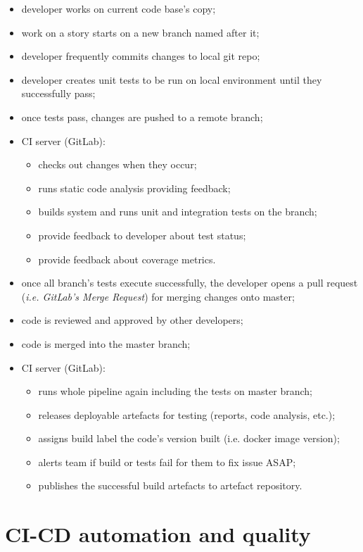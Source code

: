 \documentclass[a4paper,
	       keeplastbox,   %
	       References
	       ]{jacow}
\begin{document}
\begin{itemize}
	\setlength\itemsep{0.1em}
    \item developer works on current code base's copy;
	\item work on a story starts on a new branch named after it;
    \item developer frequently commits changes to local git repo;
    \item developer creates unit tests to be run on local environment until they successfully pass;
    \item once tests pass, changes are pushed to a remote branch;
    \item CI server (GitLab):
    \begin{itemize}
	\setlength\itemsep{0.1em}
	\item checks out changes when they occur;
	\item runs static code analysis providing feedback;
	\item builds system and runs unit and integration tests on the
		branch;
	\item provide feedback to developer about test status;
	\item provide feedback about coverage metrics.
    \end{itemize}
    \item once all branch's tests execute successfully, the developer opens a pull request (\textit{i.e. GitLab's Merge Request}) for merging changes onto master;
    \item code is reviewed and approved by other developers;
    \item code is merged into the master branch;
    \item CI server (GitLab):
    \begin{itemize}
	\setlength\itemsep{0.1em}
	\item runs whole pipeline again including the tests on master branch;
	\item releases deployable artefacts for testing (reports, code analysis, etc.);
	\item assigns build label the code's version built (i.e. docker image version);
	\item alerts team if build or tests fail for them to fix issue ASAP;
	\item publishes the successful build artefacts to artefact repository.
    \end{itemize}
\end{itemize}

\section{CI-CD automation and quality}
\end{document}
